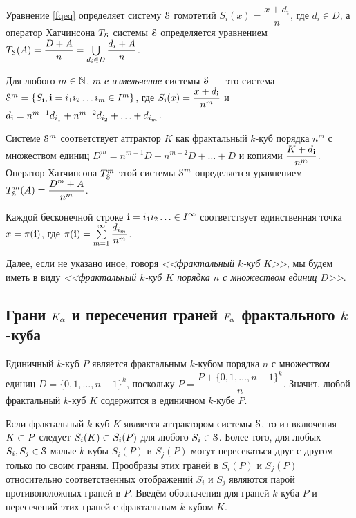 Уравнение \eqref{fqeq} определяет систему ${\EuScript S}$ гомотетий $S_i(x)=\dfrac{x+d_i}{n}$, где $d_i\in D$, а оператор Хатчинсона $T_{\EuScript S}$ системы ${\EuScript S}$ определяется уравнением $T_{\EuScript S}(A)=\dfrac{D+A}{n}=\bigcup\limits_{d_i\in D}\dfrac{d_i+A}{n}$.

\begin{definition}\label{refin}
Для любого $m\in \mathbb{N}$, {\em $m$-е измельчение} системы ${\EuScript S}$ --- это система ${\EuScript S}^m=\{S_{\bf{i}}, {\bf{i}}=i_1i_2\ldots i_m\in I^m\}$, где $S_{\bf{i}}(x)=\dfrac{x+d_{\bf{i}}}{n^m}$ и $d_{\bf{i}}=n^{m-1}d_{i_1}+n^{m-2}d_{i_2}+\ldots+d_{i_m}$. 
\end{definition}

Системе ${\EuScript S}^m$ соответствует аттрактор $K$ как фрактальный $k$-куб порядка $n^m$ с множеством единиц $D^m=n^{m-1}D+n^{m-2}D+\ldots+D$ и копиями $\dfrac{K+d_{\bf{i}}}{n^m}$.
Оператор Хатчинсона $T_{\EuScript S}^m$ этой системы ${\EuScript S}^m$ определяется уравнением $T_{\EuScript S}^m(A)=\dfrac{D^m+A}{n^m}$.

Каждой бесконечной строке ${\bf{i}}=i_1i_2\ldots\in I^\infty$ соответствует единственная точка $x=\pi({\bf{i}})$, где $\pi({\bf{i}})=\sum\limits_{m=1}^\infty \dfrac{d_{i_m}}{n^m}$.

\begin{remark}%
Далее, если не указано иное, говоря {\em <<фрактальный $k$-куб $K$>>}, мы будем иметь в виду {\em <<фрактальный $k$-куб $K$ порядка $n$ с множеством единиц $D$>>}. 
\end{remark}


\subsection{Грани $K_\alpha$ и пересечения граней $F_\alpha$ фрактального $k$-куба}

Единичный $k$-куб $P$ является фрактальным $k$-кубом порядка $n$ с множеством единиц $D=\{0,1,\ldots,n-1\}^k$, поскольку $P=\dfrac{P+\{0,1,\ldots,n-1\}^k}{n}.$
Значит, любой фрактальный $k$-куб $K$ содержится в единичном $k$-кубе $P$.

Если фрактальный $k$-куб $K$ является аттрактором системы ${\EuScript S}$, то из включения $K\subset P$ следует $S_i(K)\subset S_i(P)$ для любого $S_i\in{\EuScript S}$.
Более того, для любых $S_i, S_j\in{\EuScript S}$ малые $k$-кубы $S_i(P)$ и $S_j(P)$ могут пересекаться друг с другом только по своим граням.
Прообразы этих граней в $S_i(P)$ и $S_j(P)$ относительно соответственных отображений $S_i$ и $S_j$ являются парой противоположных граней в $P$.
Введём обозначения для граней $k$-куба $P$ и пересечений этих граней с фрактальным $k$-кубом $K$.

